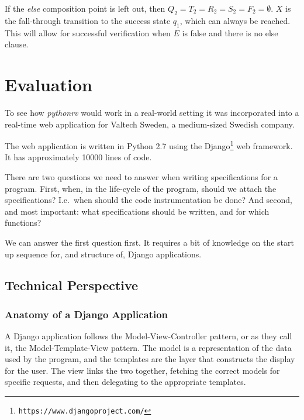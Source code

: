 \documentclass[a4paper,11pt]{kth-mag}
\begin{document}
If the \textit{else} composition point is left out, then $Q_2 = T_2 = R_2 = S_2
= F_2 = \emptyset$. $X$ is the fall-through transition to the success state
$q_1$, which can always be reached. This will allow for successful verification
when $E$ is false and there is no else clause.










\pagestyle{newchap}
\chapter{Evaluation} \label{chapter-evaluation}

To see how \textit{pythonrv} would work in a real-world setting it was
incorporated into a real-time web application for Valtech Sweden, a
medium-sized Swedish company.

The web application is written in Python 2.7 using the
Django\footnote{\texttt{https://www.djangoproject.com/}} web framework. It has
approximately 10000 lines of code.

There are two questions we need to answer when writing specifications for a
program. First, when, in the life-cycle of the program, should we attach the
specifications? I.e.\ when should the code instrumentation be done? And second,
and most important: what specifications should be written, and for which
functions?

We can answer the first question first. It requires a bit of knowledge on the
start up sequence for, and structure of, Django applications.


\section{Technical Perspective}


\subsection{Anatomy of a Django Application}

A Django application follows the Model-View-Controller pattern, or as they call
it, the Model-Template-View pattern. The model is a representation of the data
used by the program, and the templates are the layer that constructs the
display for the user. The view links the two together, fetching the correct
models for specific requests, and then delegating to the appropriate templates.
\end{document}
